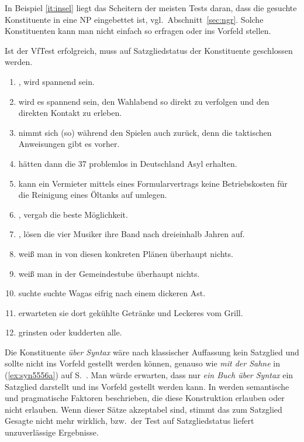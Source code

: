 In Beispiel \ref{it:insel} liegt das Scheitern der meisten Tests daran, dass die gesuchte Konstituente in eine NP eingebettet ist, vgl.\ Abschnitt~\ref{sec:ngr}.
Solche Konstituenten kann man nicht einfach so erfragen oder ins Vorfeld stellen.


Ist der VfTest erfolgreich, muss auf Satzgliedstatus der Konstituente geschlossen werden.

\begin{enumerate}\Lf
  \item {}, wird spannend sein.
  \item \VfTest {} wird es spannend sein, den Wahlabend so direkt zu verfolgen und den direkten Kontakt zu erleben.
  \item \VfTest [Er] nimmt sich (so) während den Spielen auch zurück, denn die taktischen Anweisungen gibt es vorher.
  \item {} hätten dann die 37 problemlos in Deutschland Asyl erhalten.
  \item \VfTest {} kann ein Vermieter mittels eines Formularvertrags keine Betriebskosten für die Reinigung eines Öltanks auf umlegen.
  \item {}, vergab die beste Möglichkeit.
  \item {}, lösen die vier Musiker ihre Band nach dreieinhalb Jahren auf.
  \item \VfTest {} weiß man in von diesen konkreten Plänen überhaupt nichts.
  \item {} weiß man in der Gemeindestube überhaupt nichts.
  \item \VfTest [Um zu helfen] suchte suchte Wagas eifrig nach einem dickeren Ast.
  \item {} erwarteten sie dort gekühlte Getränke und Leckeres vom Grill.
  \item {} grinsten oder kudderten alle.
\end{enumerate}


Die Konstituente \textit{über Syntax} wäre nach klassischer Auffassung kein Satzglied und sollte nicht ins Vorfeld gestellt werden können, genauso wie \textit{mit der Sahne} in (\ref{ex:syn5556a}) auf S.~\pageref{ex:syn5556a}.
Man würde erwarten, dass nur \textit{ein Buch über Syntax} ein Satzglied darstellt und ins Vorfeld gestellt werden kann.
In \citet{Dekuthy2002} werden semantische und pragmatische Faktoren beschrieben, die diese Konstruktion erlauben oder nicht erlauben.
Wenn dieser Sätze akzeptabel sind, stimmt das zum Satzglied Gesagte nicht mehr wirklich, bzw.\ der Test auf Satzgliedstatus liefert unzuverlässige Ergebnisse.

